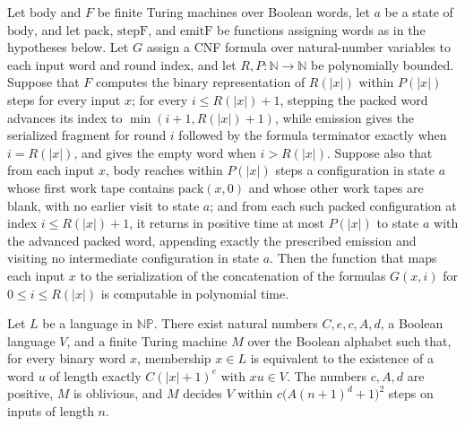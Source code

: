 \begin{lemma}
\label{Complexity.clEmitter_of_body}
\leanok
{}
Let $\mathrm{body}$ and $F$ be finite Turing machines over Boolean words, let $a$ be a
state of $\mathrm{body}$, and let $\mathrm{pack}$, $\mathrm{stepF}$, and
$\mathrm{emitF}$ be functions assigning words as in the hypotheses below. Let $G$ assign
a CNF formula over natural-number variables to each input word and round index, and let
$R,P:\mathbb{N}\to\mathbb{N}$ be polynomially bounded. Suppose that $F$ computes the
binary representation of $R(|x|)$ within $P(|x|)$ steps for every input $x$; for every
$i\le R(|x|)+1$, stepping the packed word advances its index to $\min(i+1,R(|x|)+1)$,
while emission gives the serialized fragment for round $i$ followed by the formula
terminator exactly when $i=R(|x|)$, and gives the empty word when $i>R(|x|)$. Suppose
also that from each input $x$, $\mathrm{body}$ reaches within $P(|x|)$ steps a
configuration in state $a$ whose first work tape contains $\mathrm{pack}(x,0)$ and whose
other work tapes are blank, with no earlier visit to state $a$; and from each such
packed configuration at index $i\le R(|x|)+1$, it returns in positive time at most
$P(|x|)$ to state $a$ with the advanced packed word, appending exactly the prescribed
emission and visiting no intermediate configuration in state $a$. Then the function that
maps each input $x$ to the serialization of the concatenation of the formulas $G(x,i)$
for $0\le i\le R(|x|)$ is computable in polynomial time.
\end{lemma}

\begin{lemma}
\label{Complexity.clNPVerifier}
\leanok
{}
Let $L$ be a language in $\mathbb{NP}$. There exist natural numbers $C,e,c,A,d$, a Boolean
language $V$, and a finite Turing machine $M$ over the Boolean alphabet such that, for
every binary word $x$, membership $x\in L$ is equivalent to the existence of a word $u$
of length exactly $C(|x|+1)^e$ with $xu\in V$. The numbers $c,A,d$ are positive, $M$ is
oblivious, and $M$ decides $V$ within $c\bigl(A(n+1)^d+1\bigr)^2$ steps on inputs of
length $n$.
\end{lemma}


